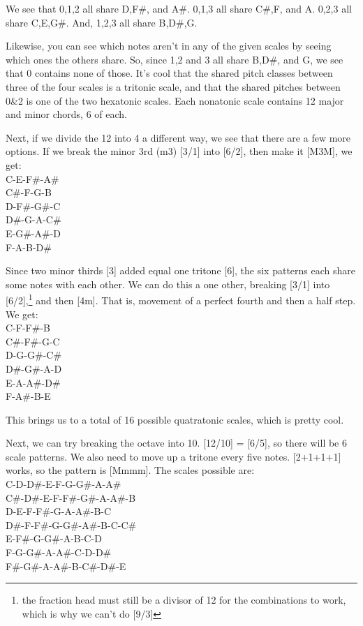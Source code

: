 \documentclass[12pt]{article}[titlepage]
\newcommand{\1}{\={a}}
\newcommand{\2}{\={e}}
\newcommand{\3}{\={\i}}
\newcommand{\4}{\=o}
\newcommand{\5}{\=u}
\newcommand{\6}{\={A}}
\renewcommand{\,}{\textsuperscript{,}}
\begin{document}
We see that 0,1,2 all share D,F\#, and A\#.
0,1,3 all share C\#,F, and A.
0,2,3 all share C,E,G\#.
And, 1,2,3 all share B,D\#,G.

Likewise, you can see which notes aren't in any of the given scales by seeing which ones the others share.
So, since 1,2 and 3 all share B,D\#, and G, we see that 0 contains none of those.
It's cool that the shared pitch classes between three of the four scales is a tritonic scale, and that the shared pitches between 0\&2 is one of the two hexatonic scales.
Each nonatonic scale contains 12 major and minor chords, 6 of each.

Next, if we divide the 12 into 4 a different way, we see that there are a few more options.
If we break the minor 3rd (m3) [3/1] into [6/2], then make it [M3M], we get:\\
C-E-F\#-A\#\\
C\#-F-G-B\\
D-F\#-G\#-C\\
D\#-G-A-C\#\\
E-G\#-A\#-D\\
F-A-B-D\#

Since two minor thirds [3] added equal one tritone [6], the six patterns each share some notes with each other.
We can do this a one other, breaking [3/1] into [6/2],\footnote{the fraction head must still be a divisor of 12 for the combinations to work, which is why we can't do [9/3]} and then [4m].
That is, movement of a perfect fourth and then a half step.
We get:\\
C-F-F\#-B\\
C\#-F\#-G-C\\
D-G-G\#-C\#\\
D\#-G\#-A-D\\
E-A-A\#-D\#\\
F-A\#-B-E

This brings us to a total of 16 possible quatratonic scales, which is pretty cool.

Next, we can try breaking the octave into 10.
[12/10] = [6/5], so there will be 6 scale patterns.
We also need to move up a tritone every five notes.
[2+1+1+1] works, so the pattern is [Mmmm].
The scales possible are:\\
C-D-D\#-E-F-G-G\#-A-A\#\\
C\#-D\#-E-F-F\#-G\#-A-A\#-B\\
D-E-F-F\#-G-A-A\#-B-C\\
D\#-F-F\#-G-G\#-A\#-B-C-C\#\\
E-F\#-G-G\#-A-B-C-D\\
F-G-G\#-A-A\#-C-D-D\#\\
F\#-G\#-A-A\#-B-C\#-D\#-E
\end{document}
